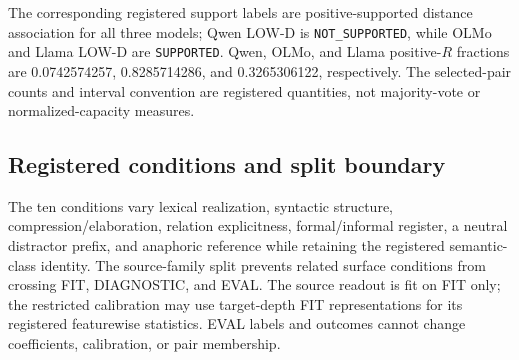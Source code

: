 \begin{table}[h]
\caption{Exact canonical three-model profile values and displayed bootstrap bounds.}
\centering
\scriptsize
{}
\end{table}

The corresponding registered support labels are positive-supported distance association for all three models; Qwen LOW-D is \texttt{NOT\_SUPPORTED}, while OLMo and Llama LOW-D are \texttt{SUPPORTED}. Qwen, OLMo, and Llama positive-$R$ fractions are 0.0742574257, 0.8285714286, and 0.3265306122, respectively. The selected-pair counts and interval convention are registered quantities, not majority-vote or normalized-capacity measures.

\subsection{Registered conditions and split boundary}
The ten conditions vary lexical realization, syntactic structure, compression/elaboration, relation explicitness, formal/informal register, a neutral distractor prefix, and anaphoric reference while retaining the registered semantic-class identity. The source-family split prevents related surface conditions from crossing FIT, DIAGNOSTIC, and EVAL. The source readout is fit on FIT only; the restricted calibration may use target-depth FIT representations for its registered featurewise statistics. EVAL labels and outcomes cannot change coefficients, calibration, or pair membership.

